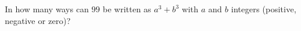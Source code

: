 In how many ways can $99$ be written as $a^3+b^3$ with $a$ and $b$ integers (positive, negative or zero)?
